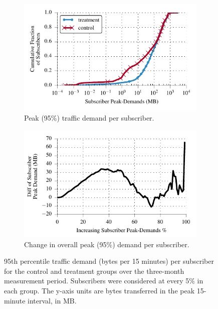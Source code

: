 \begin{figure}[t]
\begin{minipage}{\linewidth}
\centering
\begin{subfigure}[b]{.49\linewidth}
\includegraphics[width=\linewidth]{figures/cdf_peak_demand-overall.pdf}
               \caption{Peak (95\%) traffic demand per subscriber.\label{fig:CDF-data-rate-perc95}}
\end{subfigure}
\begin{subfigure}[b]{.49\linewidth}
\includegraphics[width=\linewidth]{figures/diff_perc95_bytes_subsc-overall_01.pdf}		%
               \caption{Change in overall peak (95\%) demand per subscriber.\label{fig:diff-peak-overall}}
\end{subfigure}
%
\end{minipage}
\caption{95th percentile traffic demand (bytes per 15 minutes) per
  subscriber for the control and treatment groups over the three-month
  measurement period. Subscribers were considered at every 5\% in each
  group. The y-axis units are bytes transferred in the peak 15-minute
  interval, in MB. \label{fig:traffic-demand-overall}} 
\end{figure}

